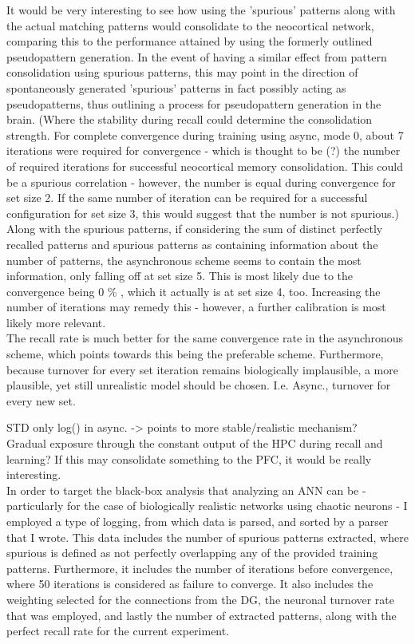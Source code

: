 It would be very interesting to see how using the 'spurious' patterns along with the actual matching patterns would consolidate to the neocortical network, comparing this to the performance attained by using the formerly outlined pseudopattern generation. In the event of having a similar effect from pattern consolidation using spurious patterns, this may point in the direction of spontaneously generated 'spurious' patterns in fact possibly acting as pseudopatterns, thus outlining a process for pseudopattern generation in the brain. (Where the stability during recall could determine the consolidation strength. For complete convergence during training using async, mode 0, about 7 iterations were required for convergence - which is thought to be (?) the number of required iterations for successful neocortical memory consolidation. This could be a spurious correlation - however, the number is equal during convergence for set size 2. If the same number of iteration can be required for a successful configuration for set size 3, this would suggest that the number is not spurious.)
\\

Along with the spurious patterns, if considering the sum of distinct perfectly recalled patterns and spurious patterns as containing information about the number of patterns, the asynchronous scheme seems to contain the most information, only falling off at set size 5. This is most likely due to the convergence being 0 \% , which it actually is at set size 4, too. Increasing the number of iterations may remedy this - however, a further calibration is most likely more relevant.
\\

The recall rate is much better for the same convergence rate in the asynchronous scheme, which points towards this being the preferable scheme. Furthermore, because turnover for every set iteration remains biologically implausible, a more plausible, yet still unrealistic model should be chosen. I.e. Async., turnover for every new set.

STD only log() in async. -> points to more stable/realistic mechanism?
\\

Gradual exposure through the constant output of the HPC during recall and learning? If this may consolidate something to the PFC, it would be really interesting.
\\

In order to target the black-box analysis that analyzing an ANN can be - particularly for the case of biologically realistic networks using chaotic neurons - I employed a type of logging, from which data is parsed, and sorted by a parser that I wrote. This data includes the number of spurious patterns extracted, where spurious is defined as not perfectly overlapping any of the provided training patterns. Furthermore, it includes the number of iterations before convergence, where 50 iterations is considered as failure to converge. It also includes the weighting selected for the connections from the DG, the neuronal turnover rate that was employed, and lastly the number of extracted patterns, along with the perfect recall rate for the current experiment.
\\

